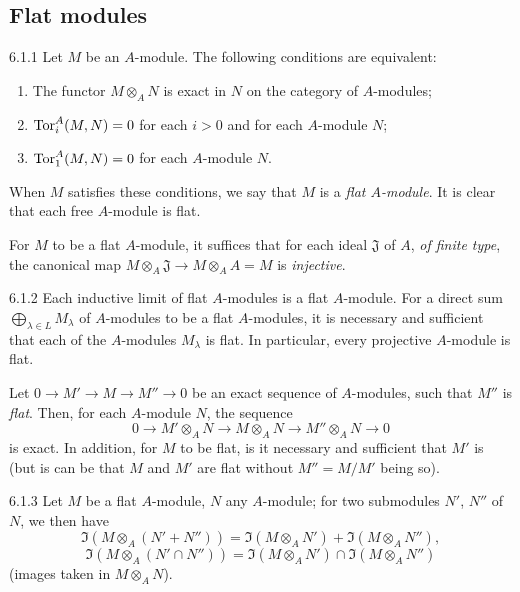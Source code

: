 \subsection{Flat modules}
\label{0-prelim-6.1}

\begin{env}{6.1.1}
\label{env-0.6.1.1}
Let $M$ be an $A$-module. The following conditions are equivalent:
\begin{enumerate}[label=(\alph*)]
  \item The functor $M\otimes_A N$ is exact in $N$ on the category of $A$-modules;
  \item ${\mathop{\mathrm{Tor}}\nolimits}_i^A(M,N)=0$ for each $i>0$ and for each $A$-module $N$;
  \item ${\mathop{\mathrm{Tor}}\nolimits}_1^A(M,N)=0$ for each $A$-module $N$.
\end{enumerate}

When $M$ satisfies these conditions, we say that $M$ is a \emph{flat $A$-module}. It is clear
that each free $A$-module is flat.

For $M$ to be a flat $A$-module, it suffices that for each ideal $\mathfrak{J}$ of $A$,
\emph{of finite type}, the canonical map $M\otimes_A\mathfrak{J}\to M\otimes_A A=M$ is
\emph{injective}.
\end{env}

\begin{env}{6.1.2}
Each inductive limit of flat $A$-modules is a flat $A$-module. For a direct sum
$\bigoplus_{\lambda\in L}M_\lambda$ of $A$-modules to be a flat $A$-modules, it is necessary
and sufficient that each of the $A$-modules $M_\lambda$ is flat. In particular, every
projective $A$-module is flat.

Let $0\to M'\to M\to M''\to 0$ be an exact sequence of $A$-modules, such that $M''$ is
\emph{flat}. Then, for each $A$-module $N$, the sequence
\[
  0\longrightarrow M'\otimes_A N\longrightarrow M\otimes_A N
  \longrightarrow M''\otimes_A N\longrightarrow 0
\]
is exact. In addition, for $M$ to be flat, is it necessary and sufficient that $M'$ is (but
is can be that $M$ and $M'$ are flat without $M''=M/M'$ being so).
\end{env}

\begin{env}{6.1.3}
\label{env-0.6.1.3}
Let $M$ be a flat $A$-module, $N$ any $A$-module; for two submodules $N'$, $N''$ of $N$, we
then have
\[
  \Im(M\otimes_A(N'+N''))=\Im(M\otimes_A N')+\Im(M\otimes_A N''),
\]
\[
  \Im(M\otimes_A(N'\cap N''))=\Im(M\otimes_A N')\cap\Im(M\otimes_A N'')
\]
(images taken in $M\otimes_A N$).
\end{env}

